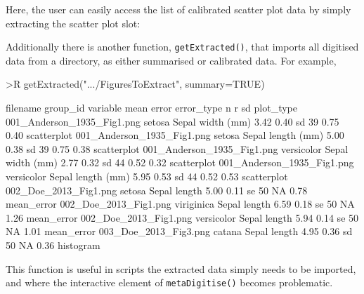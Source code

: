 \documentclass[12pt]{article}
\newcommand{\fct}[1]{\texttt{#1()}}
\begin{document}
Here, the user can easily access the list of calibrated scatter plot data by simply extracting the scatter plot slot:

\begin{CodeChunk}
\end{CodeChunk}


Additionally there is another function, \fct{getExtracted}, that imports all digitised data from a directory, as either summarised or calibrated data. For example,

\begin{CodeChunk}
\begin{CodeInput}
>R getExtracted(".../FiguresToExtract", summary=TRUE)
\end{CodeInput}
{\scriptsize
\begin{CodeOutput}
                  filename    group_id         variable   mean  error error_type n    r    sd   plot_type
001_Anderson_1935_Fig1.png      setosa  Sepal width (mm)  3.42  0.40  sd        39  0.75  0.40  scatterplot
001_Anderson_1935_Fig1.png      setosa  Sepal length (mm) 5.00  0.38  sd        39  0.75  0.38  scatterplot
001_Anderson_1935_Fig1.png  versicolor  Sepal width (mm)  2.77  0.32  sd        44  0.52  0.32  scatterplot
001_Anderson_1935_Fig1.png  versicolor  Sepal length (mm) 5.95  0.53  sd        44  0.52  0.53  scatterplot
     002_Doe_2013_Fig1.png      setosa  Sepal length      5.00  0.11  se        50  NA    0.78  mean_error
     002_Doe_2013_Fig1.png  viriginica  Sepal length      6.59  0.18  se        50  NA    1.26  mean_error
     002_Doe_2013_Fig1.png  versicolor  Sepal length      5.94  0.14  se        50  NA    1.01  mean_error
     003_Doe_2013_Fig3.png      catana  Sepal length      4.95  0.36  sd        50  NA    0.36  histogram
\end{CodeOutput}
}
\end{CodeChunk}

This function is useful in scripts the extracted data simply needs to be imported, and where the interactive element of \fct{metaDigitise} becomes problematic.
\end{document}
